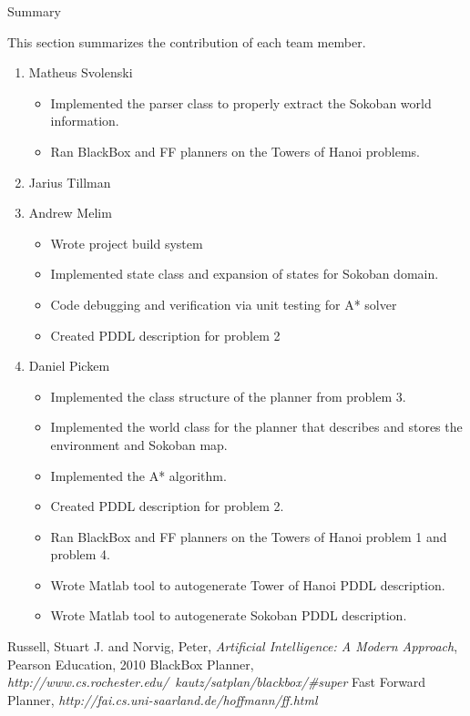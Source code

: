 \documentclass[12pt]{article}
\begin{document}
\newpage
\begin{center}
\Huge{Summary} 
\end{center}
This section summarizes the contribution of each team member. 

\begin{enumerate}
  \item Matheus Svolenski
    \begin{itemize}
     \item Implemented the parser class to properly extract the Sokoban world information.
     \item Ran BlackBox and FF planners on the Towers of Hanoi problems.
    \end{itemize}

  \item Jarius Tillman
  \item Andrew Melim
    \begin{itemize}
     \item Wrote project build system
     \item Implemented state class and expansion of states for Sokoban domain.
     \item Code debugging and verification via unit testing for A* solver
     \item Created PDDL description for problem 2
    \end{itemize}

  \item Daniel Pickem
    \begin{itemize}
     \item Implemented the class structure of the planner from problem 3.
     \item Implemented the world class for the planner that describes and stores the environment and Sokoban map.
     \item Implemented the A* algorithm.
     \item Created PDDL description for problem 2.
     \item Ran BlackBox and FF planners on the Towers of Hanoi problem 1 and problem 4.
     \item Wrote Matlab tool to autogenerate Tower of Hanoi PDDL description.
     \item Wrote Matlab tool to autogenerate Sokoban PDDL description.
    \end{itemize}
\end{enumerate}

\begin{thebibliography}{50}
   Russell, Stuart J. and Norvig, Peter, \textsl{Artificial Intelligence: A Modern Approach}, Pearson Education, 2010
   BlackBox Planner, \textsl{http://www.cs.rochester.edu/~kautz/satplan/blackbox/\#super}
   Fast Forward Planner, \textsl{http://fai.cs.uni-saarland.de/hoffmann/ff.html}
\end{thebibliography}
\end{document}
